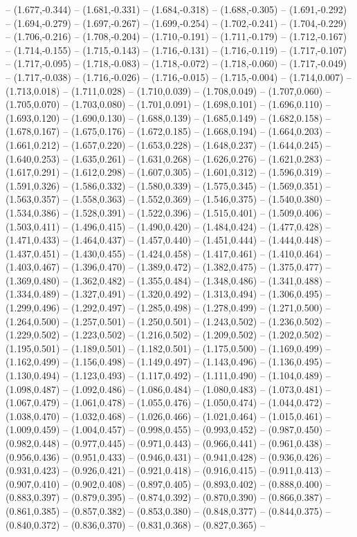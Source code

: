 -- (1.677,-0.344) -- (1.681,-0.331) -- (1.684,-0.318) -- (1.688,-0.305) -- (1.691,-0.292) -- (1.694,-0.279) -- (1.697,-0.267) -- (1.699,-0.254) -- (1.702,-0.241) -- (1.704,-0.229) -- (1.706,-0.216) -- (1.708,-0.204) -- (1.710,-0.191) -- (1.711,-0.179) -- (1.712,-0.167) -- (1.714,-0.155) -- (1.715,-0.143) -- (1.716,-0.131) -- (1.716,-0.119) -- (1.717,-0.107) -- (1.717,-0.095) -- (1.718,-0.083) -- (1.718,-0.072) -- (1.718,-0.060) -- (1.717,-0.049) -- (1.717,-0.038) -- (1.716,-0.026) -- (1.716,-0.015) -- (1.715,-0.004) -- (1.714,0.007) -- (1.713,0.018) -- (1.711,0.028) -- (1.710,0.039) -- (1.708,0.049) -- (1.707,0.060) -- (1.705,0.070) -- (1.703,0.080) -- (1.701,0.091) -- (1.698,0.101) -- (1.696,0.110) -- (1.693,0.120) -- (1.690,0.130) -- (1.688,0.139) -- (1.685,0.149) -- (1.682,0.158) -- (1.678,0.167) -- (1.675,0.176) -- (1.672,0.185) -- (1.668,0.194) -- (1.664,0.203) -- (1.661,0.212) -- (1.657,0.220) -- (1.653,0.228) -- (1.648,0.237) -- (1.644,0.245) -- (1.640,0.253) -- (1.635,0.261) -- (1.631,0.268) -- (1.626,0.276) -- (1.621,0.283) -- (1.617,0.291) -- (1.612,0.298) -- (1.607,0.305) -- (1.601,0.312) -- (1.596,0.319) -- (1.591,0.326) -- (1.586,0.332) -- (1.580,0.339) -- (1.575,0.345) -- (1.569,0.351) -- (1.563,0.357) -- (1.558,0.363) -- (1.552,0.369) -- (1.546,0.375) -- (1.540,0.380) -- (1.534,0.386) -- (1.528,0.391) -- (1.522,0.396) -- (1.515,0.401) -- (1.509,0.406) -- (1.503,0.411) -- (1.496,0.415) -- (1.490,0.420) -- (1.484,0.424) -- (1.477,0.428) -- (1.471,0.433) -- (1.464,0.437) -- (1.457,0.440) -- (1.451,0.444) -- (1.444,0.448) -- (1.437,0.451) -- (1.430,0.455) -- (1.424,0.458) -- (1.417,0.461) -- (1.410,0.464) -- (1.403,0.467) -- (1.396,0.470) -- (1.389,0.472) -- (1.382,0.475) -- (1.375,0.477) -- (1.369,0.480) -- (1.362,0.482) -- (1.355,0.484) -- (1.348,0.486) -- (1.341,0.488) -- (1.334,0.489) -- (1.327,0.491) -- (1.320,0.492) -- (1.313,0.494) -- (1.306,0.495) -- (1.299,0.496) -- (1.292,0.497) -- (1.285,0.498) -- (1.278,0.499) -- (1.271,0.500) -- (1.264,0.500) -- (1.257,0.501) -- (1.250,0.501) -- (1.243,0.502) -- (1.236,0.502) -- (1.229,0.502) -- (1.223,0.502) -- (1.216,0.502) -- (1.209,0.502) -- (1.202,0.502) -- (1.195,0.501) -- (1.189,0.501) -- (1.182,0.501) -- (1.175,0.500) -- (1.169,0.499) -- (1.162,0.499) -- (1.156,0.498) -- (1.149,0.497) -- (1.143,0.496) -- (1.136,0.495) -- (1.130,0.494) -- (1.123,0.493) -- (1.117,0.492) -- (1.111,0.490) -- (1.104,0.489) -- (1.098,0.487) -- (1.092,0.486) -- (1.086,0.484) -- (1.080,0.483) -- (1.073,0.481) -- (1.067,0.479) -- (1.061,0.478) -- (1.055,0.476) -- (1.050,0.474) -- (1.044,0.472) -- (1.038,0.470) -- (1.032,0.468) -- (1.026,0.466) -- (1.021,0.464) -- (1.015,0.461) -- (1.009,0.459) -- (1.004,0.457) -- (0.998,0.455) -- (0.993,0.452) -- (0.987,0.450) -- (0.982,0.448) -- (0.977,0.445) -- (0.971,0.443) -- (0.966,0.441) -- (0.961,0.438) -- (0.956,0.436) -- (0.951,0.433) -- (0.946,0.431) -- (0.941,0.428) -- (0.936,0.426) -- (0.931,0.423) -- (0.926,0.421) -- (0.921,0.418) -- (0.916,0.415) -- (0.911,0.413) -- (0.907,0.410) -- (0.902,0.408) -- (0.897,0.405) -- (0.893,0.402) -- (0.888,0.400) -- (0.883,0.397) -- (0.879,0.395) -- (0.874,0.392) -- (0.870,0.390) -- (0.866,0.387) -- (0.861,0.385) -- (0.857,0.382) -- (0.853,0.380) -- (0.848,0.377) -- (0.844,0.375) -- (0.840,0.372) -- (0.836,0.370) -- (0.831,0.368) -- (0.827,0.365) -- 